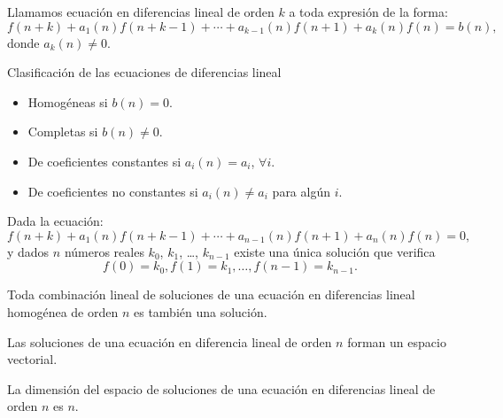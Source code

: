 \begin{frame}
	\begin{definition}
		Llamamos ecuación en diferencias lineal de orden $k$ a toda expresión de la forma:
		\[ f\left(n+k\right)+a_{1}(n)f\left(n+k-1\right)+\cdots+a_{k-1}(n)f\left(n+1\right)+a_{k}(n)f\left(n\right)=b\left(n\right), \]
		donde $a_{k}(n)\neq0$.
	\end{definition}

	\begin{block}{Clasificación de las ecuaciones de diferencias lineal}
		\begin{itemize}
			\item Homogéneas si $b(n)=0$.
			\item Completas si $b(n)\neq0$.
			\item De coeficientes constantes si $a_{i}(n)=a_{i}$, $\forall i$.
			\item De coeficientes no constantes si $a_{i}(n)\neq a_{i}$ para algún $i$.
		\end{itemize}
	\end{block}
\end{frame}

\begin{frame}
	\begin{theorem}
		Dada la ecuación: \[ f\left(n+k\right)+a_{1}(n)f\left(n+k-1\right)+\cdots+a_{n-1}(n)f\left(n+1\right)+a_{n}(n)f\left(n\right)=0, \] y dados $n$ números reales $k_{0}$, $k_{1}$, \ldots, $k_{n-1}$ existe una única solución que verifica \[ f\left(0\right)=k_{0},f\left(1\right)=k_{1},\ldots,f\left(n-1\right)=k_{n-1}. \]
	\end{theorem}

	\begin{theorem}
		Toda combinación lineal de soluciones de una ecuación en diferencias lineal homogénea de orden $n$ es también una solución.
	\end{theorem}

	\begin{corollary}
		Las soluciones de una ecuación en diferencia lineal de orden $n$ forman un espacio vectorial.
	\end{corollary}

	\begin{theorem}
		La dimensión del espacio de soluciones de una ecuación en diferencias lineal de orden $n$ es $n$.
	\end{theorem}
\end{frame}

%	


